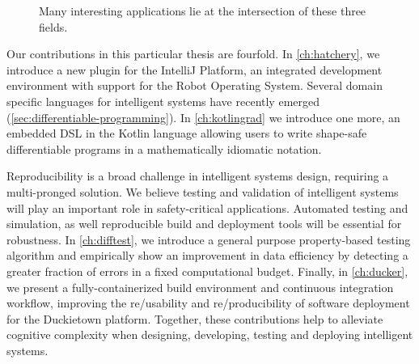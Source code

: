 \begin{figure}
    \caption{Many interesting applications lie at the intersection of these three fields.}
    \label{fig:venn_triagram}
\end{figure}

Our contributions in this particular thesis are fourfold. In \autoref{ch:hatchery}, we introduce a new plugin for the IntelliJ Platform, an integrated development environment with support for the Robot Operating System. Several domain specific languages for intelligent systems have recently emerged (\autoref{sec:differentiable-programming}). In \autoref{ch:kotlingrad} we introduce one more, an embedded DSL in the Kotlin language allowing users to write shape-safe differentiable programs in a mathematically idiomatic notation.

Reproducibility is a broad challenge in intelligent systems design, requiring a multi-pronged solution. We believe testing and validation of intelligent systems will play an important role in safety-critical applications. Automated testing and simulation, as well reproducible build and deployment tools will be essential for robustness. In \autoref{ch:difftest}, we introduce a general purpose property-based testing algorithm and empirically show an improvement in data efficiency by detecting a greater fraction of errors in a fixed computational budget. Finally, in \autoref{ch:ducker}, we present a fully-containerized build environment and continuous integration workflow, improving the re/usability and re/producibility of software deployment for the Duckietown platform. Together, these contributions help to alleviate cognitive complexity when designing, developing, testing and deploying intelligent systems.